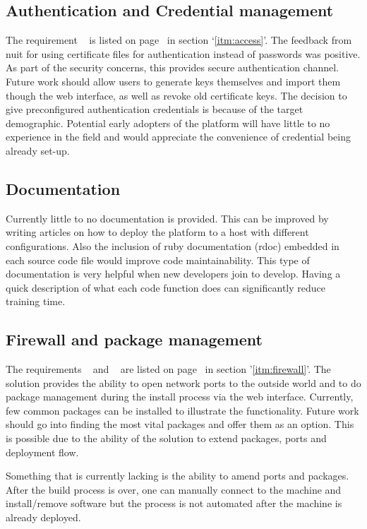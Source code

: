 \documentclass{article}
\begin{document}
\subsection{Authentication and Credential management}
The requirement ~  is listed on page~\pageref{itm:access} in section `\ref{itm:access}'.
The feedback from \gls{nuit} for using certificate files for authentication instead of passwords was positive. As part of the security concerns, this provides secure authentication channel.
Future work should allow users to generate keys themselves and import them though the web interface, as well as revoke old certificate keys.
The decision to give preconfigured authentication credentials is because of the target demographic. Potential early adopters of the platform will have little to no experience in the field and would appreciate the convenience of credential being already set-up.

\subsection{Documentation}
Currently little to no documentation is provided. This can be improved by writing articles on how to deploy the platform to a host with different configurations. Also the inclusion of ruby documentation (rdoc) embedded in each source code file would improve code maintainability. This type of documentation is very helpful when new developers join to develop. Having a quick description of what each code function does can significantly reduce training time.

\subsection{Firewall and package management}
The requirements ~ and ~ are listed on page~\pageref{itm:firewall} in section '\ref{itm:firewall}'.
The solution provides the ability to open network ports to the outside world and to do package management during the install process via the web interface. Currently, few common packages can be installed to illustrate the functionality. Future work should go into finding the most vital packages and offer them as an option. This is possible due to the ability of the solution to extend packages, ports and deployment flow.

Something that is currently lacking is the ability to amend ports and packages. After the build process is over, one can manually connect to the machine and install/remove software but the process is not automated after the machine is already deployed.
\end{document}
